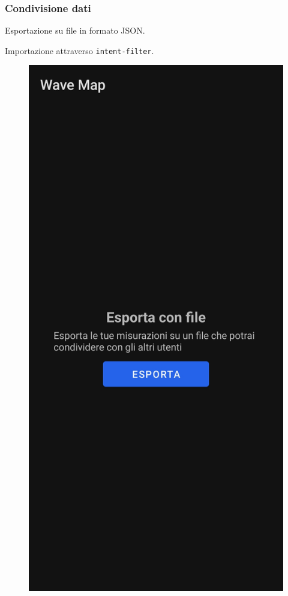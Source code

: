 \documentclass{beamer}
\begin{document}
\begin{frame}
    \frametitle{Condivisione dati}

    Esportazione su file in formato JSON.

    Importazione attraverso \texttt{intent-filter}.

    \begin{figure}[H]
        \centering
        \begin{minipage}[b]{0.25\textwidth}
          \includegraphics[width=\textwidth]{./img/overview/export1.jpg}

\end{minipage}
\end{figure}
\end{frame}
\end{document}
